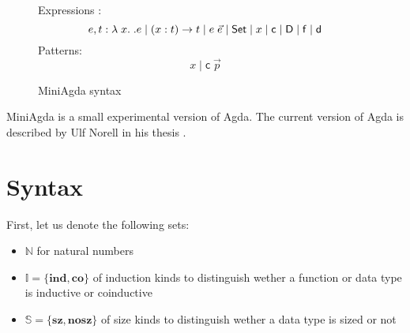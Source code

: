 \newcommand{\sleqinfty}{\rulename{sleq-infty}}

\newcommand{\sleqsucci}{\rulename{sleq-succ-i}}
\newcommand{\sleqsuccii}{\rulename{sleq-succ-ii}}
\newcommand{\sleqgen}{\rulename{sleq-gen}}

\newcommand{\dd}{\mathsf{d}}
\newcommand{\DD}{\mathsf{D}}
\newcommand{\cc}{\mathsf{c}}
\newcommand{\ff}{\mathsf{f}}

\newcommand{\cll}{\mathbb{L}}
\newcommand{\cdd}{\mathbb{D}}
\newcommand{\ccc}{\mathbb{C}}
\newcommand{\cff}{\mathbb{F}}
\newcommand{\cV}{\mathbb{V}}

\newcommand{\cS}{\mathbb{S}}
\newcommand{\cN}{\mathbb{N}}
\newcommand{\cI}{\mathbb{I}}
\newcommand{\cF}{\mathbb{F}}
\newcommand{\nF}{\mathbf{N}}
\newcommand{\lF}{\mathbf{L}}
\newcommand{\rF}{\mathbf{R}}

\newcommand{\sz}{\mathbf{sz}}
\newcommand{\ns}{\mathbf{nosz}}
\newcommand{\co}{\mathbf{co}}
\newcommand{\ind}{\mathbf{ind}}

\newcommand{\Expr}{\mathrm{Expr}}
\newcommand{\Val}{\mathrm{Val}}
\newcommand{\vlam}{\mathrm{Lam}}
\newcommand{\vpi}{\mathrm{Pi}}
\newcommand{\Clos}{\mathrm{Clos}}
\newcommand{\cl}[2]{#1^{#2}}
\newcommand{\clp}[2]{\cl{(#1)}{#2}}
\newcommand{\Env}{\mathrm{Env}}
\newcommand{\wh}{\searrow}
\newcommand{\ap}{\mathrm{app}}
\newcommand{\apf}{\mathrm{appFun}}
\newcommand{\sinfty}{\mathrm{sinfty}}
\newcommand{\lkup}{\mathrm{lkup}}
\newcommand{\ins}{\mathrm{ins}}
\newcommand{\forc}{\mathrm{force}}
\newcommand{\matchcls}{\mathrm{matchcls}}
\newcommand{\matchcl}{\mathrm{matchcl}}
\newcommand{\match}{\mathrm{match}}
\newcommand{\matchf}{\mathrm{match'}}
\newcommand{\matchList}{\mathrm{matchList}}
\newcommand{\matchInfty}{\mathrm{matchInfty}}
\newcommand{\stuck}{\;\Uparrow}
\newcommand{\Clause}{\mathrm{Clause}}
\newcommand{\Decl}{\mathrm{Decl}}
\newcommand{\Pat}{\mathrm{Pat}}

\newcommand{\Sig}{\mathrm{\Sigma}}

\begin{figure}[p]
\caption{MiniAgda syntax}
Expressions : \[e,t :  \lam x . e \mid \EPi{x}{t}{t} \mid e \; \vec{e} \mid  \Set \mid x \mid \cc \mid \DD \mid \ff \mid \dd\]
Patterns: \[ x  \mid \cc \; \vec{p} \]
\end{figure}

MiniAgda is a small experimental version of Agda.
The current version of Agda is described by Ulf Norell in his thesis \cite{norell:thesis}.



\section{Syntax}
First, let us denote the following sets:
\begin{itemize}
\item
$ \cN $ for natural numbers
\item
$ \cI = \{ \ind , \co \} $ of induction kinds to distinguish wether a function or data type is 
inductive or coinductive  
\item
$ \cS = \{ \sz, \ns \} $ of size kinds to distinguish wether a data type is sized or not
\end{itemize}

